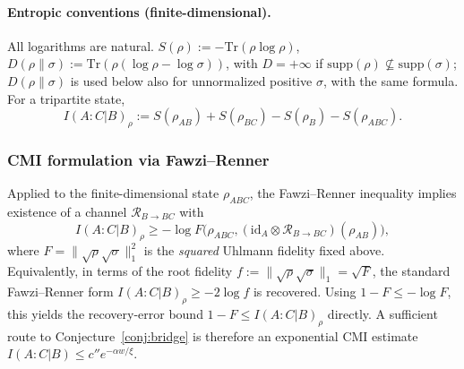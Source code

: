 \documentclass[11pt]{article}
\newcommand{\Tr}{\mathrm{Tr}}
\begin{document}
\paragraph{Entropic conventions (finite-dimensional).}
All logarithms are natural. $S(\rho) := -\Tr(\rho\log\rho)$,
$D(\rho\|\sigma) := \Tr(\rho(\log\rho - \log\sigma))$, with
$D = +\infty$ if $\mathrm{supp}(\rho) \nsubseteq \mathrm{supp}(\sigma)$;
$D(\rho\|\sigma)$ is used below also for unnormalized positive $\sigma$, with
the same formula. For a tripartite state,
\begin{equation}
I(A:C|B)_\rho := S(\rho_{AB}) + S(\rho_{BC}) - S(\rho_B) - S(\rho_{ABC}).
\end{equation}

\subsubsection{CMI formulation via Fawzi--Renner}

Applied to the finite-dimensional state $\rho_{ABC}$, the Fawzi--Renner
inequality \cite{FR} implies existence of a channel $\mathcal{R}_{B\to BC}$
with
\begin{equation}
I(A:C|B)_\rho \ge -\log F\bigl(\rho_{ABC},
 (\mathrm{id}_A \otimes \mathcal{R}_{B\to BC})(\rho_{AB})\bigr),
\label{eq:FR}
\end{equation}
where $F = \|\sqrt\rho\sqrt\sigma\|_1^2$ is the \emph{squared} Uhlmann fidelity
fixed above. Equivalently, in terms of the root fidelity
$f := \|\sqrt\rho\sqrt\sigma\|_1 = \sqrt{F}$, the standard Fawzi--Renner form
$I(A:C|B)_\rho \ge -2\log f$ is recovered. Using $1 - F \le -\log F$, this
yields the recovery-error bound $1 - F \le I(A:C|B)_\rho$ directly. A
sufficient route to Conjecture~\ref{conj:bridge} is therefore an exponential
CMI estimate $I(A:C|B) \le c'' e^{-\alpha w/\xi}$.
\end{document}
